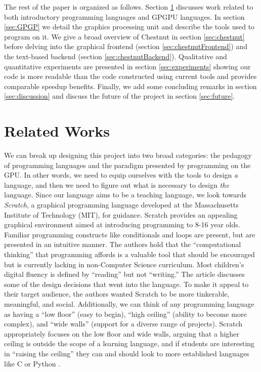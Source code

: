 \documentclass[twocolumn]{article}
\renewcommand{\|}{\origbar} %
\begin{document}
The rest of the paper is organized as follows. Section \ref{sec:relatedWorks} discusses work related to both introductory programming languages and GPGPU languages. In section \ref{sec:GPGP} we detail the graphics processing unit and describe the tools used to program on it. We give a broad overview of Chestnut in section \ref{sec:chestnut} before delving into the graphical frontend (section \ref{sec:chestnutFrontend}) and the text-based backend (section \ref{sec:chestnutBackend}). Qualitative and quantitative experiments are presented in section \ref{sec:experiments} showing our code is more readable than the code constructed using current tools and provides comparable speedup benefits. Finally, we add some concluding remarks in section \ref{sec:discussion} and discuss the future of the project in section \ref{sec:future}.

\section{Related Works}
\label{sec:relatedWorks}

We can break up designing this project into two broad categories: the pedagogy of programming languages and the paradigm presented by programming on the GPU. In other words, we need to equip ourselves with the tools to design {\em a} language, and then we need to figure out what is necessary to design {\em the} language. Since our language aims to be a teaching language, we look towards {\em Scratch}, a graphical programming language developed at the Massachusetts Institute of Technology (MIT), for guidance. Scratch provides an appealing graphical environment aimed at introducing programming to 8-16 year olds. Familiar programming constructs like conditionals and loops are present, but are presented in an intuitive manner. The authors hold that the ``computational thinking'' that programming affords is a valuable tool that should be encouraged but is currently lacking in non-Computer Science curriculum. Most children's digital fluency is defined by ``reading'' but not ``writing.'' The article discusses some of the design decisions that went into the language. To make it appeal to their target audience, the authors wanted Scratch to be more tinkerable, meaningful, and social. Additionally, we can think of any programming language as having a ``low floor'' (easy to begin), ``high ceiling'' (ability to become more complex), and ``wide walls'' (support for a diverse range of projects). Scratch appropriately focuses on the low floor and wide walls, arguing that a higher ceiling is outside the scope of a learning language, and if students are interesting in ``raising the ceiling'' they can and should look to more established languages like C or Python \cite{resnick}.
\end{document}
